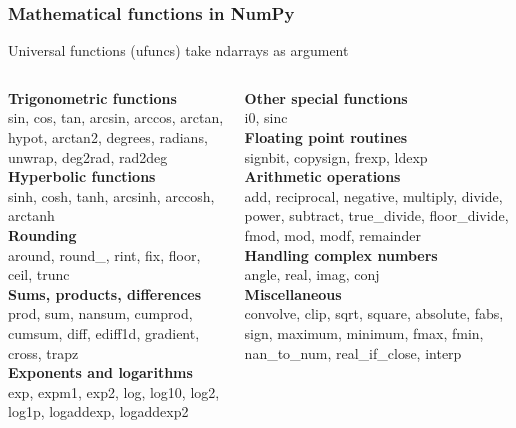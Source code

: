 \begin{frame}[fragile]\frametitle{Mathematical functions in NumPy}
 \hspace*{-0.45truecm} Universal functions (ufuncs) take ndarrays as argument

 \vspace{0.4truecm}
 \begin{columns}[t]
  \begin{column}{0.5\linewidth}
   \begin{scriptsize}%
    \textbf{Trigonometric functions}\\
     {\tiny sin, cos, tan, arcsin, arccos, arctan, hypot, arctan2, degrees,
      radians, unwrap, deg2rad, rad2deg}\\[0.2truecm]
   \textbf{Hyperbolic functions}\\
     {\tiny sinh, cosh, tanh, arcsinh, arccosh, arctanh}\\[0.2truecm]
   \textbf{Rounding}\\
     {\tiny around, round\_, rint, fix, floor, ceil, trunc}\\[0.2truecm]
   \textbf{Sums, products, differences}\\
     {\tiny prod, sum, nansum, cumprod, cumsum, diff, ediff1d,
      gradient, cross, trapz}\\[0.2truecm]
   \textbf{Exponents and logarithms}\\
     {\tiny exp, expm1, exp2, log, log10, log2, log1p, logaddexp,
      logaddexp2}\\[0.2truecm]
   \end{scriptsize}
  \end{column}%
  \begin{column}{0.5\linewidth}
   \begin{scriptsize}%
    \textbf{Other special functions}\\
     {\tiny i0, sinc}\\[0.2truecm]
    \textbf{Floating point routines}\\
     {\tiny signbit, copysign, frexp, ldexp}\\[0.2truecm]
    \textbf{Arithmetic operations}\\
     {\tiny add, reciprocal, negative, multiply, divide, power, subtract,
      true\_divide, floor\_divide, fmod, mod, modf, remainder}\\[0.2truecm]
    \textbf{Handling complex numbers}\\
     {\tiny angle, real, imag, conj}\\[0.2truecm]
    \textbf{Miscellaneous}\\
     {\tiny convolve, clip, sqrt, square, absolute, fabs, sign, maximum,
      minimum, fmax, fmin, nan\_to\_num, real\_if\_close, interp}\\
   \end{scriptsize}
  \end{column}
 \end{columns}


\end{frame}
